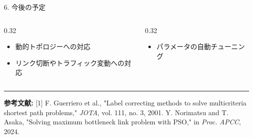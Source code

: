 \documentclass[final,t]{beamer}
\begin{document}
\begin{frame}[fragile]
\begin{block}{6. 今後の予定}
\begin{columns}[T, onlytextwidth]
        \begin{column}{0.32\linewidth}
            \begin{itemize}
                \item 動的ト\hspace{-0.2em}ポロジーへの対応
                \item リンク切断やト\hspace{-0.2em}ラフィック変動への対応
            \end{itemize}
        \end{column}
        
        \begin{column}{0.32\linewidth}
            \begin{itemize}
                \item パラメータの自動チューニング
            \end{itemize}
        \end{column}
    \end{columns}
\end{block}

\vspace{0.5cm}

\hrule
\vspace{0.5em}
{\tiny
\textbf{参考文献:}
[1] F. Guerriero et al., "Label correcting methods to solve multicriteria shortest path problems," \textit{JOTA}, vol. 111, no. 3, 2001. \quad
[2] Y. Norimatsu and T. Asaka, "Solving maximum bottleneck link problem with PSO," in \textit{Proc. APCC}, 2024.
}

\end{frame}
\end{document}
